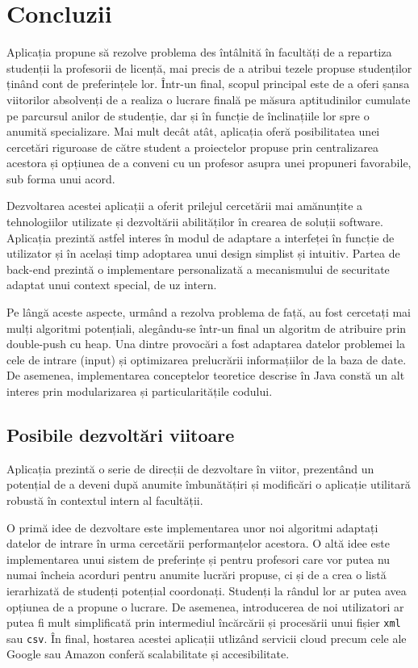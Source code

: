 \chapter*{Concluzii} 

Aplicația \thesistitle propune să rezolve problema des întâlnită în facultăți de a repartiza studenții la profesorii de licență, mai precis de a atribui tezele propuse studenților ținând cont de preferințele lor. Într-un final, scopul principal este de a oferi șansa viitorilor absolvenți de a realiza o lucrare finală pe măsura aptitudinilor cumulate pe parcursul anilor de studenție, dar și în funcție de înclinațiile lor spre o anumită specializare. Mai mult decât atât, aplicația oferă posibilitatea unei cercetări riguroase de către student a proiectelor propuse prin centralizarea acestora și opțiunea de a conveni cu un profesor asupra unei propuneri favorabile, sub forma unui acord.

Dezvoltarea acestei aplicații a oferit prilejul cercetării mai amănunțite a tehnologiilor utilizate și dezvoltării abilităților în crearea de soluții software. Aplicația prezintă astfel interes în modul de adaptare a interfeței în funcție de utilizator și în același timp adoptarea unui design simplist și intuitiv. Partea de back-end prezintă o implementare personalizată a mecanismului de securitate adaptat unui context special, de uz intern.

Pe lângă aceste aspecte, urmând a rezolva problema de față, au fost cercetați mai mulți algoritmi potențiali, alegându-se într-un final un algoritm de atribuire prin double-push cu heap. Una dintre provocări a fost adaptarea datelor problemei la cele de intrare (input) și optimizarea prelucrării informațiilor de la baza de date. De asemenea, implementarea conceptelor teoretice descrise în Java constă un alt interes prin modularizarea și particularitățile codului.

\section*{Posibile dezvoltări viitoare}

Aplicația prezintă o serie de direcții de dezvoltare în viitor, prezentând un potențial de a deveni după anumite îmbunătățiri și modificări o aplicație utilitară robustă în contextul intern al facultății.

O primă idee de dezvoltare este implementarea unor noi algoritmi adaptați datelor de intrare în urma cercetării performanțelor acestora. O altă idee este implementarea unui sistem de preferințe și pentru profesori care vor putea nu numai încheia acorduri pentru anumite lucrări propuse, ci și de a crea o listă ierarhizată de studenți potențial coordonați. Studenți la rândul lor ar putea avea opțiunea de a propune o lucrare. De asemenea, introducerea de noi utilizatori ar putea fi mult simplificată prin intermediul încărcării și procesării unui fișier \texttt{xml} sau \texttt{csv}. În final, hostarea acestei aplicații utlizând servicii cloud precum cele ale Google sau Amazon conferă scalabilitate și accesibilitate.